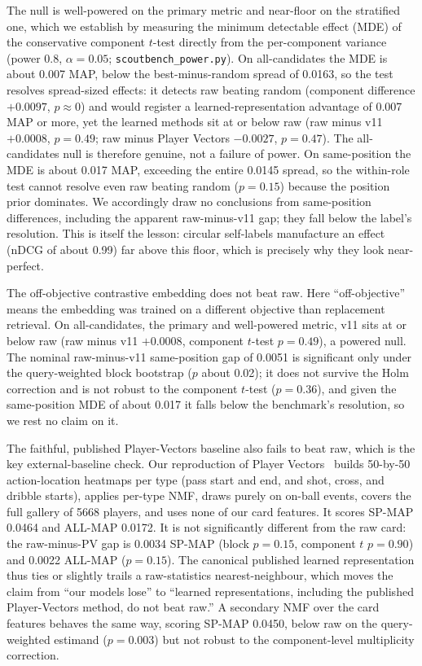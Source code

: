 The null is well-powered on the primary metric and near-floor on the stratified
one, which we establish by measuring the minimum detectable effect (MDE) of the
conservative component $t$-test directly from the per-component variance (power
0.8, $\alpha = 0.05$; \texttt{scoutbench\_power.py}). On all-candidates the MDE
is about 0.007 MAP, below the best-minus-random spread of 0.0163, so the test
resolves spread-sized effects: it detects raw beating random (component
difference $+0.0097$, $p \approx 0$) and would register a
learned-representation advantage of 0.007 MAP or more, yet the learned methods
sit at or below raw (raw minus v11 $+0.0008$, $p = 0.49$; raw minus Player
Vectors $-0.0027$, $p = 0.47$). The all-candidates null is therefore genuine,
not a failure of power. On same-position the MDE is about 0.017 MAP, exceeding
the entire 0.0145 spread, so the within-role test cannot resolve even raw
beating random ($p = 0.15$) because the position prior dominates. We accordingly
draw no conclusions from same-position differences, including the apparent
raw-minus-v11 gap; they fall below the label's resolution. This is itself the
lesson: circular self-labels manufacture an effect (nDCG of about 0.99) far
above this floor, which is precisely why they look near-perfect.

The off-objective contrastive embedding does not beat raw. Here ``off-objective''
means the embedding was trained on a different objective than replacement
retrieval. On all-candidates, the primary and well-powered metric, v11 sits at
or below raw (raw minus v11 $+0.0008$, component $t$-test $p = 0.49$), a powered
null. The nominal raw-minus-v11 same-position gap of 0.0051 is significant only
under the query-weighted block bootstrap ($p$ about 0.02); it does not survive
the Holm correction and is not robust to the component $t$-test ($p = 0.36$),
and given the same-position MDE of about 0.017 it falls below the benchmark's
resolution, so we rest no claim on it.

The faithful, published Player-Vectors baseline also fails to beat raw, which
is the key external-baseline check. Our reproduction of Player
Vectors~\cite{decroos2019playervectors} builds 50-by-50 action-location
heatmaps per type (pass start and end, and shot, cross, and dribble starts),
applies per-type NMF, draws purely on on-ball events, covers the full gallery
of 5668 players, and uses none of our card features. It scores SP-MAP 0.0464
and ALL-MAP 0.0172. It is not significantly different from the raw card: the
raw-minus-PV gap is 0.0034 SP-MAP (block $p = 0.15$, component $t$
$p = 0.90$) and 0.0022 ALL-MAP ($p = 0.15$). The canonical published learned
representation thus ties or slightly trails a raw-statistics
nearest-neighbour, which moves the claim from ``our models lose'' to ``learned
representations, including the published Player-Vectors method, do not beat
raw.'' A secondary NMF over the card features behaves the same way, scoring
SP-MAP 0.0450, below raw on the query-weighted estimand ($p = 0.003$) but not
robust to the component-level multiplicity correction.

